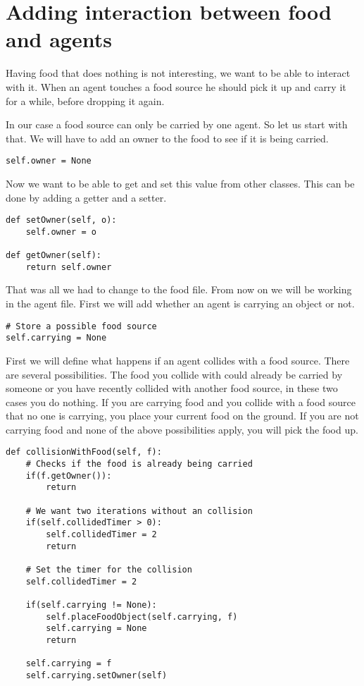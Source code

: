 \section{Adding interaction between food and agents}
Having food that does nothing is not interesting, we want to be able to interact with it. When an agent touches a food source he should pick it up and carry it for a while, before dropping it again.

In our case a food source can only be carried by one agent. So let us start with that. We will have to add an owner to the food to see if it is being carried.

\begin{lstlisting}
self.owner = None
\end{lstlisting}

Now we want to be able to get and set this value from other classes. This can be done by adding a getter and a setter.
\begin{lstlisting}
def setOwner(self, o):
    self.owner = o

def getOwner(self):
    return self.owner
\end{lstlisting}
That was all we had to change to the food file. From now on we will be working in the agent file. First we will add whether an agent is carrying an object or not.
\begin{lstlisting}
# Store a possible food source
self.carrying = None
\end{lstlisting}

First we will define what happens if an agent collides with a food source. There are several possibilities. The food you collide with could already be carried by someone or you have recently collided with another food source, in these two cases you do nothing. If you are carrying food and you collide with a food source that no one is carrying, you place your current food on the ground. If you are not carrying food and none of the above possibilities apply, you will pick the food up.
\begin{lstlisting}
def collisionWithFood(self, f):
    # Checks if the food is already being carried
    if(f.getOwner()):
        return

    # We want two iterations without an collision
    if(self.collidedTimer > 0):
        self.collidedTimer = 2
        return

    # Set the timer for the collision
    self.collidedTimer = 2

    if(self.carrying != None):
        self.placeFoodObject(self.carrying, f)
        self.carrying = None
        return

    self.carrying = f
    self.carrying.setOwner(self)
\end{lstlisting}

